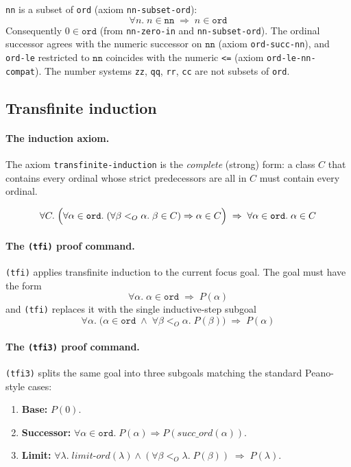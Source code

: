 \texttt{nn} is a subset of \texttt{ord} (axiom \texttt{nn-subset-ord}):
\[
  \forall n.\; n \in \mathtt{nn} \;\Rightarrow\; n \in \mathtt{ord}
\]
Consequently $0 \in \mathtt{ord}$ (from \texttt{nn-zero-in} and
\texttt{nn-subset-ord}).  The ordinal successor agrees with the numeric
successor on $\mathtt{nn}$ (axiom \texttt{ord-succ-nn}), and
\texttt{ord-le} restricted to $\mathtt{nn}$ coincides with the numeric
\texttt{<=} (axiom \texttt{ord-le-nn-compat}).  The number systems
\texttt{zz}, \texttt{qq}, \texttt{rr}, \texttt{cc} are not subsets of
\texttt{ord}.

\subsection{Transfinite induction}
\label{sec:ord-induction}

\paragraph{The induction axiom.}

\begin{sloppypar}The axiom \texttt{transfinite-induction} is the \emph{complete} (strong)
form: a class $C$ that contains every ordinal whose strict predecessors are
all in $C$ must contain every ordinal.\end{sloppypar}
\[
  \forall C.\;
  \Bigl(\forall\alpha \in \mathtt{ord}.\;
        (\forall\beta <_O \alpha.\; \beta \in C) \Rightarrow \alpha \in C\Bigr)
  \;\Rightarrow\;
  \forall\alpha \in \mathtt{ord}.\; \alpha \in C
\]

\paragraph{The \texttt{(tfi)} proof command.}

\texttt{(tfi)} applies transfinite induction to the current focus goal.
The goal must have the form
\[
  \forall \alpha.\; \alpha \in \mathtt{ord} \;\Rightarrow\; P(\alpha)
\]
and \texttt{(tfi)} replaces it with the single inductive-step subgoal
\[
  \forall \alpha.\;
    \bigl(\alpha \in \mathtt{ord} \;\land\;
          \forall\beta <_O \alpha.\; P(\beta)\bigr)
    \;\Rightarrow\; P(\alpha)
\]

\paragraph{The \texttt{(tfi3)} proof command.}

\texttt{(tfi3)} splits the same goal into three subgoals matching the
standard Peano-style cases:
\begin{enumerate}
\item \textbf{Base:} $P(0)$.
\item \textbf{Successor:} $\forall\alpha \in \mathtt{ord}.\; P(\alpha) \Rightarrow P(\mathit{succ\_ord}(\alpha))$.
\item \textbf{Limit:} $\forall\lambda.\;
  \mathit{limit\text{-}ord}(\lambda) \land
  (\forall\beta <_O \lambda.\; P(\beta)) \;\Rightarrow\; P(\lambda)$.
\end{enumerate}

